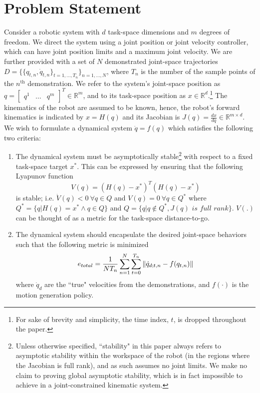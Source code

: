 \documentclass[letterpaper, 10 pt, conference,fleqn]{ieeeconf}
\begin{document}
\section{Problem Statement} \label{Sec:Prob}
Consider a robotic system with $d$ task-space dimensions and $m$ degrees of freedom. We direct the system using a joint position or joint velocity controller, which can have joint position limits and a maximum joint velocity. We are further provided with a set of $N$ demonstrated joint-space trajectories $D=\{\{q_{t,n},\dot{q}_{t,n}\}_{t=1,\dots, T_n}\}_{n=1,\dots,N}$, where $T_n$ is the number of the sample points of the $n^{\text{th}}$ demonstration. We refer to the system's joint-space position as $q=\begin{bmatrix} q^1 & \dots & q^m
\end{bmatrix}^T \in \mathbb{R}^m$, and to its task-space position as $x\in \mathbb{R}^d$.\footnote{For sake of brevity and simplicity, the time index, $t$, is dropped throughout the paper. } The kinematics of the robot are assumed to be known, hence, the robot's forward kinematics is indicated by $x = H(q)$ and its Jacobian is $J(q) = \frac{dx}{dq}\in \mathbb{R}^{m\times d}$.\\
We wish to formulate a dynamical system $\dot{q} = f(q)$ which satisfies the following two criteria:
\renewcommand{\labelenumi}{(\Roman{enumi})}
\begin{enumerate}
\item The dynamical system must be asymptotically stable\footnote{Unless otherwise specified, ``stability" in this paper always refers to asymptotic stability within the workspace of the robot (in the regions where the Jacobian is full rank), and as such assumes no joint limits. We make no claim to proving global asymptotic stability, which is in fact impossible to achieve in a joint-constrained kinematic system.} with respect to a fixed task-space target $x^*$. This can be expressed by ensuring that the following Lyapunov function
\begin{equation}
V(q) = (H(q) - x^*)^T(H(q) - x^*) 
\label{eq:Lyp}
\end{equation}
is stable; i.e. $\dot{V}(q) < 0 ~\forall q\in Q$ and $V(q)=0~ \forall q\in Q^*$ where $Q^*=\{q|H(q)=x^*\wedge q\in Q\}$ and $Q=\{q|q\notin Q^*, J(q) \textit{ is full rank}\}$. $V(.)$ can be thought of as a metric for the task-space distance-to-go.
\item The dynamical system should encapsulate the desired joint-space behaviors such that the following metric is minimized
\begin{equation}
\vspace{-5pt}
e_{total} = \frac{1}{NT_n}\sum_{n=1}^N\sum_{t=0}^{T_n} \left \| \dot{q}_{d; t,n} - f(q_{t,n}) \right \|
\label{eq:optim_error}
\end{equation}
  where $\dot{q}_d$ are the ``true" velocities from the demonstrations, and $f(\cdot)$ is the motion generation policy.
\end{enumerate}
\end{document}
